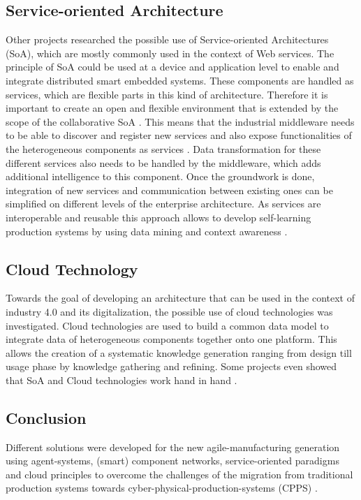 \documentclass[conference,compsoc]{IEEEtran}
\begin{document}
\subsection{Service-oriented Architecture}
Other projects researched the possible use of Service-oriented Architectures (SoA), which are mostly commonly used in the context of Web services. The principle of SoA could be used at a device and application level to enable and integrate distributed smart embedded systems. These components are handled as services, which are flexible parts in this kind of architecture. Therefore it is important to create an open and flexible environment that is extended by the scope of the collaborative SoA \cite{HarmonizedSystems}. This means that the industrial middleware needs to be able to discover and register new services and also expose functionalities of the heterogeneous components as services \cite{SpecPERFoRM}. Data transformation for these different services also needs to be handled by the middleware, which adds additional intelligence to this component. Once the groundwork is done, integration of new services and communication between existing ones can be simplified on different levels of the enterprise architecture. As services are interoperable and reusable this approach allows to develop self-learning production systems by using data mining and context awareness \cite{HarmonizedSystems}.


\subsection{Cloud Technology}
Towards the goal of developing an architecture that can be used in the context of industry 4.0 and its digitalization, the possible use of cloud technologies was investigated. Cloud technologies are used to build a common data model to integrate data of heterogeneous components together onto one platform. This allows the creation of a systematic knowledge generation ranging from design till usage phase by knowledge gathering and refining. Some projects even showed that SoA and Cloud technologies work hand in hand \cite{HarmonizedSystems}.  

\subsection{Conclusion}
Different solutions were developed for the new agile-manufacturing generation using agent-systems, (smart) component networks, service-oriented paradigms and cloud principles to overcome the challenges of the migration from traditional production systems towards cyber-physical-production-systems (CPPS) \cite{HarmonizedSystems}.
\end{document}

